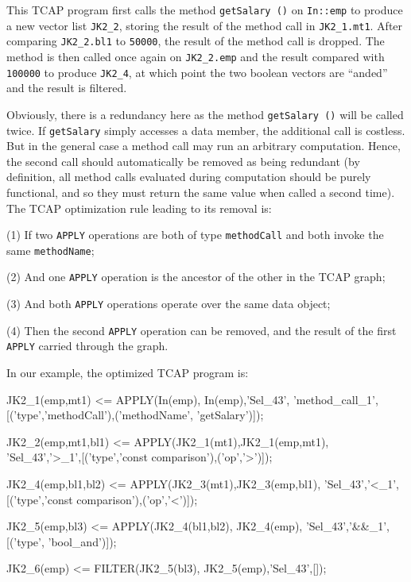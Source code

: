 \noindent
This TCAP program first calls the method \texttt{getSalary ()} on \texttt{In::emp} to produce a new vector list \texttt{JK2\_2}, storing the result
of the method call in \texttt{JK2\_1.mt1}.  After comparing \texttt{JK2\_2.bl1} to \texttt{50000}, the result of the method call is dropped.
The method is then called once again on \texttt{JK2\_2.emp} and the result compared with \texttt{100000} to produce \texttt{JK2\_4}, at which 
point the two boolean vectors are ``anded'' and the result is filtered.

Obviously, there is a redundancy here as the method \texttt{getSalary ()} will be called twice.
If \texttt{getSalary} simply accesses a data member, the additional call is costless.  But in the general case a method call may run an arbitrary
computation.  Hence, the second call should automatically be removed as being redundant 
(by definition, all method calls evaluated during computation should
be purely functional, and so they must return the same value when called a second time).
The TCAP optimization rule leading to its removal is:

\vspace{5pt}

\noindent
(1) If two \texttt{APPLY} operations are both of type \texttt{methodCall} and both invoke the same \texttt{methodName};

\noindent
(2) And one \texttt{APPLY} operation is the ancestor of the other in the TCAP graph;

\noindent
(3) And both \texttt{APPLY} operations operate over the same data object;

\noindent
(4) Then the second \texttt{APPLY} operation can be removed, and the
result of the first \texttt{APPLY} carried through the graph.

\vspace{5pt}

\noindent
In our example, the
optimized
TCAP program is:

\begin{codesmall}
JK2_1(emp,mt1) <= APPLY(In(emp), In(emp),'Sel_43', 
'method_call_1',[('type','methodCall'),('methodName',
'getSalary')]);

JK2_2(emp,mt1,bl1) <= APPLY(JK2_1(mt1),JK2_1(emp,mt1), 
'Sel_43','>_1',[('type','const comparison'),('op','>')]);

JK2_4(emp,bl1,bl2) <= APPLY(JK2_3(mt1),JK2_3(emp,bl1),
'Sel_43','<_1',[('type','const comparison'),('op','<')]);

JK2_5(emp,bl3) <= APPLY(JK2_4(bl1,bl2), JK2_4(emp), 
'Sel_43','&&_1',[('type', 'bool_and')]);

JK2_6(emp) <= FILTER(JK2_5(bl3), JK2_5(emp),'Sel_43',[]);
  
\end{codesmall}

